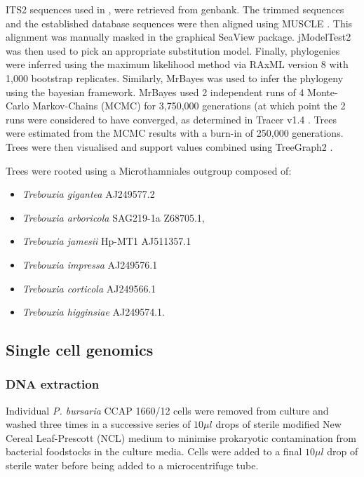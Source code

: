ITS2 sequences used in \citep{Hoshina2010}, \citep{Hoshina2013} were retrieved
from genbank. 
The trimmed sequences and the established database sequences were then
aligned using MUSCLE \citep{Edgar2004}. This alignment was manually masked in the graphical 
SeaView \citep{Gouy2010} package.
jModelTest2 \citep{Guindon2003,Darriba2012} was then used to pick an appropriate substitution model.
Finally, phylogenies were inferred using the maximum likelihood
method via RAxML version 8 \citep{Stamatakis2014} with 1,000 bootstrap replicates.
Similarly, MrBayes \citep{Huelsenbeck2001} was used to infer the phylogeny using the bayesian
framework.  MrBayes used 2 independent runs of 4 Monte-Carlo Markov-Chains (MCMC) for
3,750,000 generations (at which point the 2 runs were considered to have converged, 
as determined in Tracer v1.4 \citep{rambaut2007tracer}.  Trees were estimated
from the MCMC results with a burn-in of 250,000 generations.
Trees were then visualised and support values combined using TreeGraph2 \citep{Stover2010}.

Trees were rooted using a Microthamniales outgroup composed of:
\begin{itemize}
    \item \textit{Trebouxia gigantea} AJ249577.2 
    \item \textit{Trebouxia arboricola} SAG219-1a Z68705.1,
    \item \textit{Trebouxia jamesii} Hp-MT1 AJ511357.1
    \item \textit{Trebouxia impressa} AJ249576.1
    \item \textit{Trebouxia corticola} AJ249566.1
    \item \textit{Trebouxia higginsiae} AJ249574.1.
\end{itemize}

\subsection{Single cell genomics}

\subsubsection{DNA extraction}

Individual \textit{P. bursaria} CCAP 1660/12 cells were removed from culture 
and washed three times in a successive series of 
\(10 \mu l\) drops of sterile modified 
New Cereal Leaf-Prescott (NCL) medium to minimise prokaryotic contamination from 
bacterial foodstocks in the culture media. 
Cells were added to a final \(10\mu l\) drop of sterile water before being added
to a microcentrifuge tube.

